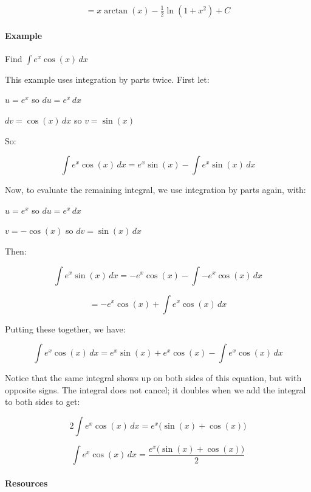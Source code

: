 $$= x \arctan(x) - \tfrac{1}{2} \ln(1 + x^2) + C$$



\paragraph{Example}



Find $\int e^x \cos(x) \, dx$



This example uses integration by parts twice. First let:



$u = e^x$ so $du = e^x \, dx$  

$dv = \cos(x) \, dx$ so $v = \sin(x)$



So:



$$\int e^x \cos(x) \, dx = e^x \sin(x) - \int e^x \sin(x) \, dx$$



Now, to evaluate the remaining integral, we use integration by parts again, with:



$u = e^x$ so $du = e^x \, dx$  

$v = -\cos(x)$ so $dv = \sin(x) \, dx$



Then:



$$\int e^x \sin(x) \, dx = -e^x \cos(x) - \int -e^x \cos(x) \, dx$$  

$$= -e^x \cos(x) + \int e^x \cos(x) \, dx$$



Putting these together, we have:



$$\int e^x \cos(x) \, dx = e^x \sin(x) + e^x \cos(x) - \int e^x \cos(x) \, dx$$



Notice that the same integral shows up on both sides of this equation, but with opposite signs. The integral does not cancel; it doubles when we add the integral to both sides to get:



$$2\int e^x \cos(x) \, dx = e^x\bigl(\sin(x) + \cos(x)\bigr)$$  

$$\int e^x \cos(x) \, dx = \frac{e^x\bigl(\sin(x) + \cos(x)\bigr)}{2}$$



\paragraph{Resources}



